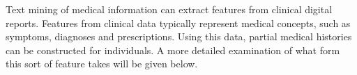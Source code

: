 








Text mining of medical information can extract features from clinical digital reports. Features from clinical data typically represent medical concepts, such as symptoms, diagnoses and prescriptions. Using this data, partial medical histories can be constructed for individuals. A more detailed examination of what form this sort of feature takes will be given below.

 
